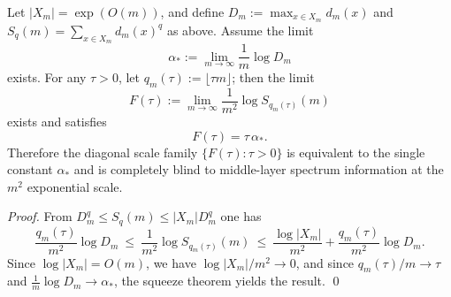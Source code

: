 \begin{theorem}\label{thm:pom-diagonal-moment-free-energy-degeneracy}
Let \(|X_m|=\exp(O(m))\), and define
\(
D_m:=\max_{x\in X_m} d_m(x)
\)
and
\(
S_q(m)=\sum_{x\in X_m} d_m(x)^q
\)
as above.
Assume the limit
\[
\alpha_*:=\lim_{m\to\infty}\frac{1}{m}\log D_m
\]
exists.
For any \(\tau>0\), let \(q_m(\tau):=\lfloor\tau m\rfloor\); then the limit
\[
F(\tau):=\lim_{m\to\infty}\frac{1}{m^2}\log S_{q_m(\tau)}(m)
\]
exists and satisfies
\[
\boxed{\;F(\tau)=\tau\,\alpha_*.\;}
\]
Therefore the diagonal scale family \(\{F(\tau):\tau>0\}\) is equivalent to the single constant \(\alpha_*\) and is completely blind to middle-layer spectrum information at the \(m^2\) exponential scale.
\end{theorem}
\begin{proof}
From \(D_m^{q}\le S_q(m)\le |X_m|D_m^q\) one has
\[
\frac{q_m(\tau)}{m^2}\log D_m
\ \le\
\frac{1}{m^2}\log S_{q_m(\tau)}(m)
\ \le\
\frac{\log|X_m|}{m^2}+\frac{q_m(\tau)}{m^2}\log D_m.
\]
Since \(\log|X_m|=O(m)\), we have \(\log|X_m|/m^2\to 0\), and since \(q_m(\tau)/m\to\tau\) and \(\frac{1}{m}\log D_m\to\alpha_*\), the squeeze theorem yields the result. \qed
\end{proof}

